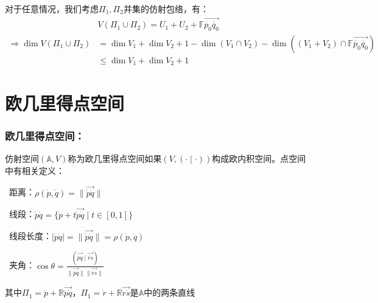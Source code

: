 \documentclass[zihao=5,UTF8]{report}
\def\F{\mathbb{F}}
\def\R{\mathbb{R}}
\def\A{\mathbb{A}}
\theoremstyle{mystyle} %
\begin{document}
对于任意情况，我们考虑$\Pi_1, \Pi_2$并集的仿射包络，有：
\begin{align*}
    &V(\Pi_1\cup\Pi_2 ) = U_1 + U_2 + \F\overrightarrow{\dot{p_0}\dot{q_0}}\\ 
    \Longrightarrow \dim V(\Pi_1\cup\Pi_2 ) &= \dim V_1 +  \dim V_2 + 1  - \dim (V_1\cap V_2) - \dim ((V_1+V_2)\cap \F\overrightarrow{\dot{p_0}\dot{q_0}}) \\ 
    &\le \dim V_1 +  \dim V_2 + 1
\end{align*} \par

\section{欧几里得点空间}

\subsubsection{欧几里得点空间：}
仿射空间$(\A,V)$称为欧几里得点空间如果$(V,(\cdot\mid\cdot))$构成欧内积空间。点空间中有相关定义：
\par{}\ 距离：$\rho(\dot{p}, \dot{q}) = \|\overrightarrow{\dot{p}\dot{q}}\|$    \par
{}\  线段：$\dot{p}\dot{q} = \{\dot{p} + t\overrightarrow{\dot{p}\dot{q}}\mid t \in [0,1]\}$   \par
{}\  线段长度：$|\dot{p}\dot{q}| =\|\overrightarrow{\dot{p}\dot{q}}\|= \rho(\dot{p}, \dot{q}) $   \par
{}\ 夹角：$\cos \theta = \frac{(\overrightarrow{\dot{p}\dot{q}}\mid \overrightarrow{\dot{r}\dot{s}})}{\| \overrightarrow{\dot{p}\dot{q}} \| \| \overrightarrow{\dot{r}\dot{s}} \|}$
{\par\color{gray}\small
其中$\Pi_1 = \dot{p} + \R\overrightarrow{\dot{p}\dot{q}}$，$\Pi_1 = \dot{r} + \R\overrightarrow{\dot{r}\dot{s}}$是$\A$中的两条直线
\par}
\end{document}
